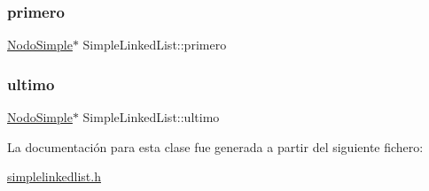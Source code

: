 \mbox{\label{class_simple_linked_list_a8bfa0f48fc7ace062a1220477f7e824b}} 
\subsubsection{\texorpdfstring{primero}{primero}}
{\footnotesize\ttfamily \mbox{\hyperlink{class_nodo_simple}{Nodo\+Simple}}$\ast$ Simple\+Linked\+List\+::primero}

\mbox{\label{class_simple_linked_list_a2f2e30e2a9c1a8bfdf518bc28b6fcf0c}} 
\subsubsection{\texorpdfstring{ultimo}{ultimo}}
{\footnotesize\ttfamily \mbox{\hyperlink{class_nodo_simple}{Nodo\+Simple}}$\ast$ Simple\+Linked\+List\+::ultimo}



La documentación para esta clase fue generada a partir del siguiente fichero\+:\begin{DoxyCompactItemize}
\item 
\mbox{\hyperlink{simplelinkedlist_8h}{simplelinkedlist.\+h}}\end{DoxyCompactItemize}
